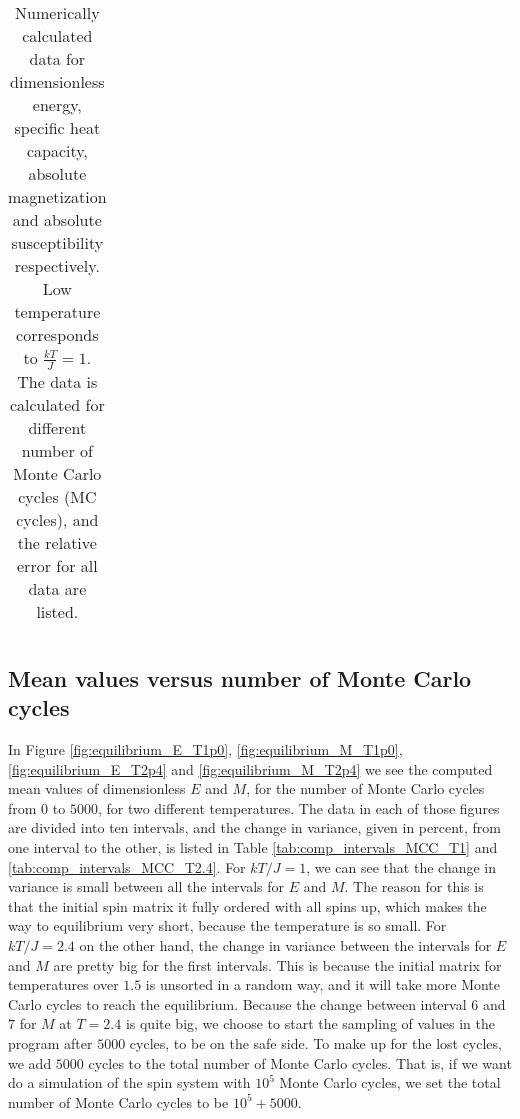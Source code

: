 \documentclass[12pt]{article}
\begin{document}
\begin{flushleft}
\begin{table}[!h]
\begin{center}
\begin{tabular}{| c | c | c || c | c | c |}
  \hline
\end{tabular}
\end{center}
\caption{\label{tab:numeric_low_T}Numerically calculated data for dimensionless energy, specific heat capacity, absolute magnetization and absolute susceptibility respectively. Low temperature corresponds to $\frac{kT}{J} = 1$. The data is calculated for different number of Monte Carlo cycles (MC cycles), and the relative error for all data are listed.}
\end{table}


\subsection{Mean values versus number of Monte Carlo cycles}
In Figure \ref{fig:equilibrium_E_T1p0}, \ref{fig:equilibrium_M_T1p0}, \ref{fig:equilibrium_E_T2p4} and \ref{fig:equilibrium_M_T2p4} we see the computed mean values of dimensionless $E$ and $M$, for the number of Monte Carlo cycles from $0$ to $5000$, for two different temperatures. The data in each of those figures are divided into ten intervals, and the change in variance, given in percent, from one interval to the other, is listed in Table \ref{tab:comp_intervals_MCC_T1} and \ref{tab:comp_intervals_MCC_T2.4}. For $kT/J = 1$, we can see that the change in variance is small between all the intervals for $E$ and $M$. The reason for this is that the initial spin matrix it fully ordered with all spins up, which makes the way to equilibrium very short, because the temperature is so small. For $kT/J = 2.4$ on the other hand, the change in variance between the intervals for $E$ and $M$ are pretty big for the first intervals. This is because the initial matrix for temperatures over $1.5$ is unsorted in a random way, and it will take more Monte Carlo cycles to reach the equilibrium. Because the change between interval $6$ and $7$ for $M$ at $T=2.4$ is quite big, we choose to start the sampling of values in the program after $5000$ cycles, to be on the safe side. To make up for the lost cycles, we add $5000$ cycles to the total number of Monte Carlo cycles. That is, if we want do a simulation of the spin system with $10^5$ Monte Carlo cycles, we set the total number of Monte Carlo cycles to be $10^5+5000$.


\end{flushleft}
\end{document}
